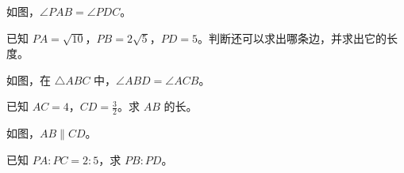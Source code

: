 \documentclass{exam-zh}
\begin{document}

\begin{problem}[points=10]
  \noindent
  \begin{minipage}[t]{\dimexpr\linewidth-60mm-6mm\relax}
    \vspace{0pt}
    如图，$\angle PAB=\angle PDC$。

已知 $PA=\sqrt{10}$，$PB=2\sqrt{5}$，$PD=5$。判断还可以求出哪条边，并求出它的长度。
    
  \end{minipage}\hfill
  \begin{diagramcoltikz}{60mm}{}
  }
  \end{diagramcoltikz}
  \par\medskip
  \answerarea[54mm]
\end{problem}



\begin{problem}[points=10]
  \noindent
  \begin{minipage}[t]{\dimexpr\linewidth-60mm-6mm\relax}
    \vspace{0pt}
    如图，在 $\triangle ABC$ 中，$\angle ABD=\angle ACB$。

已知 $AC=4$，$CD=\frac{3}{2}$。求 $AB$ 的长。
    
  \end{minipage}\hfill
  \begin{diagramcoltikz}{60mm}{}
  }
  \end{diagramcoltikz}
  \par\medskip
  \answerarea[54mm]
\end{problem}



\begin{problem}[points=10]
  \noindent
  \begin{minipage}[t]{\dimexpr\linewidth-60mm-6mm\relax}
    \vspace{0pt}
    如图，$AB\parallel CD$。

已知 $PA:PC=2:5$，求 $PB:PD$。
    
  \end{minipage}\hfill
  \begin{diagramcoltikz}{60mm}{}
  }
  \end{diagramcoltikz}
  \par\medskip
  \answerarea[48mm]
\end{problem}
\end{document}
